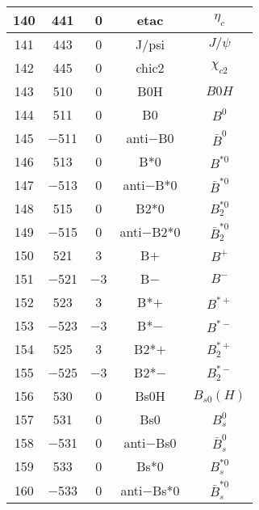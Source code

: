 \documentclass{article}
\begin{document}
\begin{table}[!htbp]
\begin{tabular}{|c|c|c|c|c|}
\hline
140 & 441 & 0 & eta\underline{\hspace{0.6em}}c & $\eta_{c}$ \\
\hline
141 & 443 & 0 & J/psi & $J/\psi$ \\
\hline
142 & 445 & 0 & chi\underline{\hspace{0.6em}}c2 & $\chi_{c2}$ \\
\hline
143 & 510 & 0 & B0H & $B0H$ \\
\hline
144 & 511 & 0 & B0 & $B^{0}$ \\
\hline
145 & $-$511 & 0 & anti$-$B0 & $\bar{B}^{0}$ \\
\hline
146 & 513 & 0 & B*0 & $B^{*0}$ \\
\hline
147 & $-$513 & 0 & anti$-$B*0 & $\bar{B}^{*0}$ \\
\hline
148 & 515 & 0 & B\underline{\hspace{0.6em}}2*0 & $B_{2}^{*0}$ \\
\hline
149 & $-$515 & 0 & anti$-$B\underline{\hspace{0.6em}}2*0 & $\bar{B}_{2}^{*0}$ \\
\hline
150 & 521 & 3 & B$+$ & $B^{+}$ \\
\hline
151 & $-$521 & $-$3 & B$-$ & $B^{-}$ \\
\hline
152 & 523 & 3 & B*$+$ & $B^{*+}$ \\
\hline
153 & $-$523 & $-$3 & B*$-$ & $B^{*-}$ \\
\hline
154 & 525 & 3 & B\underline{\hspace{0.6em}}2*$+$ & $B_{2}^{*+}$ \\
\hline
155 & $-$525 & $-$3 & B\underline{\hspace{0.6em}}2*$-$ & $B_{2}^{*-}$ \\
\hline
156 & 530 & 0 & B\underline{\hspace{0.6em}}s0H & $B_{s0}(H)$ \\
\hline
157 & 531 & 0 & B\underline{\hspace{0.6em}}s0 & $B_{s}^{0}$ \\
\hline
158 & $-$531 & 0 & anti$-$B\underline{\hspace{0.6em}}s0 & $\bar{B}_{s}^{0}$ \\
\hline
159 & 533 & 0 & B\underline{\hspace{0.6em}}s*0 & $B_{s}^{*0}$ \\
\hline
160 & $-$533 & 0 & anti$-$B\underline{\hspace{0.6em}}s*0 & $\bar{B}_{s}^{*0}$ \\
\hline
\end{tabular}
\end{table}
\end{document}
